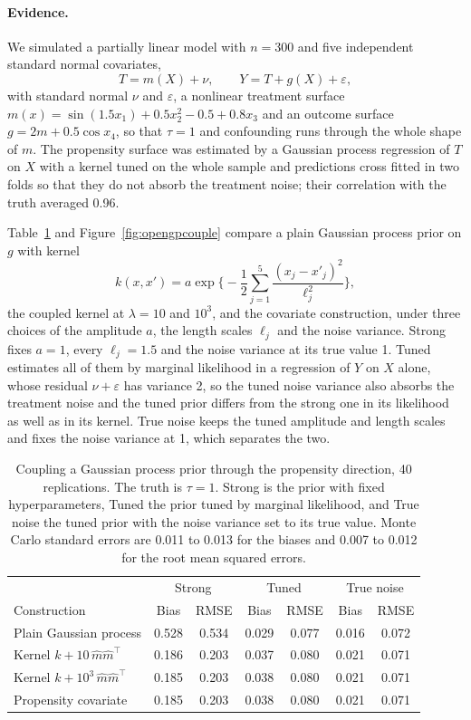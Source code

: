 \paragraph{Evidence.} We simulated a partially linear model with $n = 300$ and five independent standard normal covariates,
\[
T = m(X) + \nu, \qquad Y = T + g(X) + \varepsilon,
\]
with standard normal $\nu$ and $\varepsilon$, a nonlinear treatment surface $m(x) = \sin(1.5x_1) + 0.5x_2^2 - 0.5 + 0.8x_3$ and an outcome surface $g = 2m + 0.5\cos x_4$, so that $\tau = 1$ and confounding runs through the whole shape of $m$. The propensity surface was estimated by a Gaussian process regression of $T$ on $X$ with a kernel tuned on the whole sample and predictions cross fitted in two folds so that they do not absorb the treatment noise; their correlation with the truth averaged 0.96.

Table~\ref{tab:opengp} and Figure~\ref{fig:opengpcouple} compare a plain Gaussian process prior on $g$ with kernel
\[
k(x, x') = a\exp\Big\{-\frac{1}{2}\sum_{j=1}^{5}\frac{(x_j - x'_j)^2}{\ell_j^2}\Big\},
\]
the coupled kernel at $\lambda = 10$ and $10^3$, and the covariate construction, under three choices of the amplitude $a$, the length scales $\ell_j$ and the noise variance. Strong fixes $a = 1$, every $\ell_j = 1.5$ and the noise variance at its true value 1. Tuned estimates all of them by marginal likelihood in a regression of $Y$ on $X$ alone, whose residual $\nu + \varepsilon$ has variance 2, so the tuned noise variance also absorbs the treatment noise and the tuned prior differs from the strong one in its likelihood as well as in its kernel. True noise keeps the tuned amplitude and length scales and fixes the noise variance at 1, which separates the two.

\begin{table}[ht]
\centering
\caption{Coupling a Gaussian process prior through the propensity direction, 40 replications. The truth is $\tau = 1$. Strong is the prior with fixed hyperparameters, Tuned the prior tuned by marginal likelihood, and True noise the tuned prior with the noise variance set to its true value. Monte Carlo standard errors are 0.011 to 0.013 for the biases and 0.007 to 0.012 for the root mean squared errors.}
\label{tab:opengp}
\small
\begin{tabular}{lcccccc}
\toprule
& \multicolumn{2}{c}{Strong} & \multicolumn{2}{c}{Tuned} & \multicolumn{2}{c}{True noise} \\
Construction & Bias & RMSE & Bias & RMSE & Bias & RMSE \\
\midrule
Plain Gaussian process & 0.528 & 0.534 & 0.029 & 0.077 & 0.016 & 0.072 \\
Kernel $k + 10\,\hat m\hat m^\top$ & 0.186 & 0.203 & 0.037 & 0.080 & 0.021 & 0.071 \\
Kernel $k + 10^3\,\hat m\hat m^\top$ & 0.185 & 0.203 & 0.038 & 0.080 & 0.021 & 0.071 \\
Propensity covariate & 0.185 & 0.203 & 0.038 & 0.080 & 0.021 & 0.071 \\
\bottomrule
\end{tabular}
\end{table}

